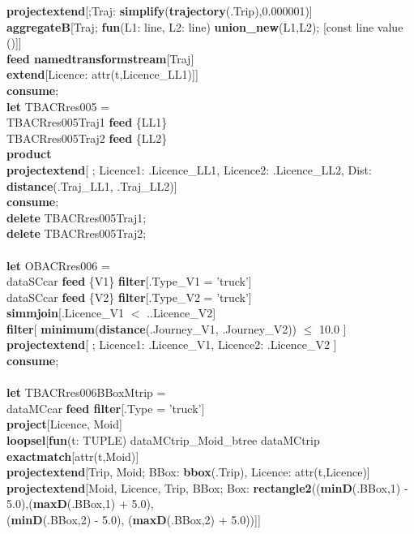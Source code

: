 \documentclass[a4paper]{article}
\newcommand{\op}[1]{\textbf{#1}}
\begin{document}
\begin{scriptsize}
\begin{tabbing}
\>\op{projectextend}[;Traj: \op{simplify}(\op{trajectory}(.Trip),0.000001)]\\
\>\op{aggregateB}[Traj; \op{fun}(L1: line, L2: line) \op{ union\_new}(L1,L2); [const line value ()]]\\
\>\op{feed namedtransformstream}[Traj]\\
\>\op{extend}[Licence: attr(t,Licence\_LL1)]]\\
\op{consume};\\
\op{let} TBACRres005 = \\
\>TBACRres005Traj1 \op{feed} \{LL1\}\\
\>TBACRres005Traj2 \op{feed} \{LL2\}\\
\>\op{product}\\
\>\op{projectextend}[ ; Licence1: .Licence\_LL1, Licence2: .Licence\_LL2, Dist: \op{distance}(.Traj\_LL1, .Traj\_LL2)]\\
\op{consume};\\
\op{delete} TBACRres005Traj1;\\
\op{delete} TBACRres005Traj2;\\
\\
\op{let} OBACRres006 =\\
\>dataSCcar \op{feed} \{V1\} \op{filter}[.Type\_V1 = 'truck']\\
\>dataSCcar \op{feed} \{V2\} \op{filter}[.Type\_V2 = 'truck']\\
\>\op{simmjoin}[.Licence\_V1 $<$ ..Licence\_V2]\\
\>\op{filter}[ \op{minimum}(\op{distance}(.Journey\_V1, .Journey\_V2)) $\leq$ 10.0 ]\\
\>\op{projectextend}[ ; Licence1: .Licence\_V1, Licence2: .Licence\_V2 ]\\
\op{consume};\\
\\
\op{let} TBACRres006BBoxMtrip =\\
\>dataMCcar \op{feed filter}[.Type = 'truck']\\
\>\op{project}[Licence, Moid]\\
\>\op{loopsel}[\op{fun}(t: TUPLE) dataMCtrip\_Moid\_btree dataMCtrip \op{exactmatch}[attr(t,Moid)]\\
\>\>\op{projectextend}[Trip, Moid; BBox: \op{bbox}(.Trip), Licence: attr(t,Licence)]\\
\>\>\op{projectextend}[Moid, Licence, Trip, BBox; Box: \op{rectangle2}((\op{minD}(.BBox,1) - 5.0),(\op{maxD}(.BBox,1) + 5.0),\\
\>\>\>\>(\op{minD}(.BBox,2) - 5.0), (\op{maxD}(.BBox,2) + 5.0))]]\\

\end{tabbing}
\end{scriptsize}
\end{document}
